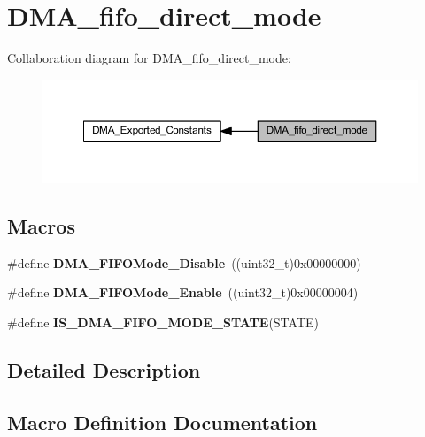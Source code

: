 \hypertarget{group___d_m_a__fifo__direct__mode}{}\section{D\+M\+A\+\_\+fifo\+\_\+direct\+\_\+mode}
\label{group___d_m_a__fifo__direct__mode}
Collaboration diagram for D\+M\+A\+\_\+fifo\+\_\+direct\+\_\+mode\+:
\nopagebreak
\begin{figure}[H]
\begin{center}
\leavevmode
\includegraphics[width=350pt]{group___d_m_a__fifo__direct__mode}
\end{center}
\end{figure}
\subsection*{Macros}
\begin{DoxyCompactItemize}
\item 
\mbox{\label{group___d_m_a__fifo__direct__mode_gadad9e503fa9867a981e3090d333483d7}} 
\#define {\bfseries D\+M\+A\+\_\+\+F\+I\+F\+O\+Mode\+\_\+\+Disable}~((uint32\+\_\+t)0x00000000)
\item 
\mbox{\label{group___d_m_a__fifo__direct__mode_ga482bc2af420602d1a8c2aa35049a3857}} 
\#define {\bfseries D\+M\+A\+\_\+\+F\+I\+F\+O\+Mode\+\_\+\+Enable}~((uint32\+\_\+t)0x00000004)
\item 
\#define {\bfseries I\+S\+\_\+\+D\+M\+A\+\_\+\+F\+I\+F\+O\+\_\+\+M\+O\+D\+E\+\_\+\+S\+T\+A\+TE}(S\+T\+A\+TE)
\end{DoxyCompactItemize}


\subsection{Detailed Description}


\subsection{Macro Definition Documentation}
\mbox{\label{group___d_m_a__fifo__direct__mode_gadb90a893aeb49fd4bc14af750af3837c}} 
